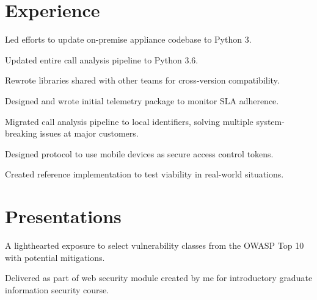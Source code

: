 \documentclass[]{deedy-resume-openfont}
\begin{document}
\begin{minipage}[t]{0.64\textwidth}


\section{Experience}
\vspace{\topsep} %
\begin{tightemize}
\item Led efforts to update on-premise appliance codebase to Python 3.
\item Updated entire call analysis pipeline to Python 3.6.
\item Rewrote libraries shared with other teams for cross-version compatibility.
\item Designed and wrote initial telemetry package to monitor SLA adherence. 
\item Migrated call analysis pipeline to local identifiers, solving multiple system-breaking issues at major customers.
\end{tightemize}
\sectionsep

\begin{tightemize}
\item Designed protocol to use mobile devices as secure access control tokens.
\item Created reference implementation to test viability in real-world situations.
\end{tightemize}
\sectionsep


\section{Presentations} 
\begin{tightemize}
\item A lighthearted exposure to select vulnerability classes from the OWASP Top 10 with potential mitigations.
\item Delivered as part of web security module created by me for introductory graduate information security course.
\end{tightemize}
\sectionsep


\end{minipage}
\end{document}
